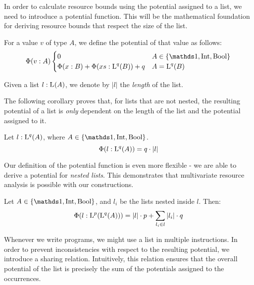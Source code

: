 In order to calculate resource bounds using the potential assigned to a list, we need to introduce a potential function. This will be the mathematical foundation for deriving resource bounds that respect the size of the list. 

\begin{definition}\label{def:potential-function}
   For a value \(v\) of type \(A\), we define the potential of that value as follows:
   \[
      \Phi(v : A) \begin{cases}
         0                                            & A \in \{\unit, \typeint, \bool\}\\
         \Phi(x : B) + \Phi(xs : \ralist{q}{B}) + q   & A = \ralist{q}{B}
      \end{cases}
   \]
\end{definition}

\begin{definition}\label{def:list-length}
   Given a list \(l : \text{L}^{}(A)\), we denote by \(|l|\) the \emph{length} of the list.
\end{definition}

The following corollary proves that, for lists that are not nested, the resulting potential of a list is \emph{only} dependent on the length of the list and the potential assigned to it.

\begin{corollary}\label{cor:potential-list}
   Let \(l : \text{L}^{q}(A)\), where \(A \in \{\unit, \typeint, \bool\}\). 
   \[
      \Phi(l : \text{L}^{q}(A)) = q \cdot |l|
   \]
\end{corollary}

Our definition of the potential function is even more flexible - we are able to derive a potential for \emph{nested lists}. This demonstrates that multivariate resource analysis is possible with our constructions.

\begin{corollary}\label{cor:potential-nested-list}
   Let \(A \in \{\unit, \typeint, \bool\}\), and \(l_i\) be the lists nested inside \(l\). Then:
   \[
      \Phi(l : \text{L}^{p}(\text{L}^{q}(A))) = |l| \cdot p + \sum_{l_i \in l} |l_i| \cdot q
   \]
\end{corollary}

Whenever we write programs, we might use a list in multiple instructions. In order to prevent inconsistencies with respect to the resulting potential, we introduce a sharing relation. Intuitively, this relation ensures that the overall potential of the list is precisely the sum of the potentials assigned to the occurrences.

